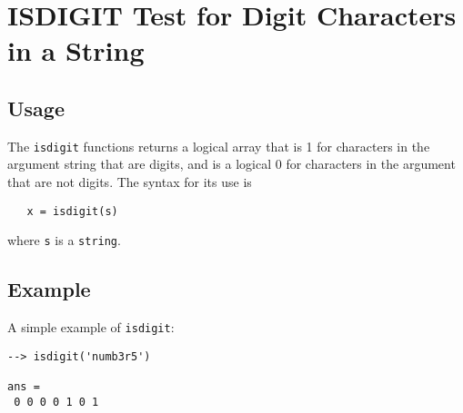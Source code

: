 \section{ISDIGIT Test for Digit Characters in a String}

\subsection{Usage}

The \verb|isdigit| functions returns a logical array that is 1 
for characters in the argument string that are digits, and 
is a logical 0 for characters in the argument that are not
digits.  The syntax for its use is
\begin{verbatim}
   x = isdigit(s)
\end{verbatim}
where \verb|s| is a \verb|string|.  
\subsection{Example}

A simple example of \verb|isdigit|:
\begin{verbatim}
--> isdigit('numb3r5')

ans = 
 0 0 0 0 1 0 1 
\end{verbatim}
